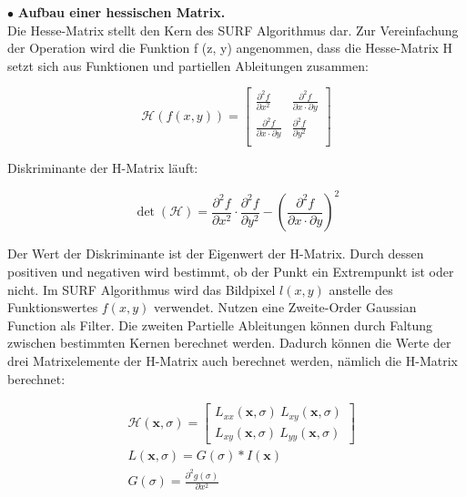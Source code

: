 $\bullet$ \textbf{Aufbau einer hessischen Matrix.}\\
Die Hesse-Matrix stellt den Kern des SURF Algorithmus dar. Zur Vereinfachung der Operation wird die Funktion f (z, y) angenommen, dass die Hesse-Matrix H setzt sich aus Funktionen und partiellen Ableitungen zusammen:

\begin{equation}
   \mathcal{H}(f(x,y)) = \begin{bmatrix}
   \frac{\partial^{2}f}{\partial x^{2}} & \frac{\partial^{2}f}{\partial x \cdot \partial y} \\
   \frac{\partial^{2}f}{\partial x \cdot \partial y} & \frac{\partial^{2}f}{\partial y^{2}} \\   
   \end{bmatrix}
\end{equation}

 Diskriminante der H-Matrix läuft:
 
\begin{equation}
   \det(\mathcal{H}) = \frac{\partial^{2}f}{\partial x^{2}} \cdot \frac{\partial^{2}f}{\partial y^{2}} - (\frac{\partial^{2}f}{\partial x \cdot \partial y})^2  
\end{equation}

Der Wert der Diskriminante ist der Eigenwert der H-Matrix. Durch dessen positiven und negativen wird bestimmt, ob der Punkt ein Extrempunkt ist oder nicht. Im SURF Algorithmus wird das Bildpixel $l(x,y)$ anstelle des Funktionswertes $f(x,y)$ verwendet. Nutzen eine Zweite-Order Gaussian Function als Filter. Die zweiten Partielle Ableitungen können durch Faltung zwischen bestimmten Kernen berechnet werden. Dadurch können die Werte der drei Matrixelemente der H-Matrix auch berechnet werden, nämlich die H-Matrix berechnet:

\begin{equation}
\begin{split}
   &\mathcal{H}(\textbf{x},\sigma) = \begin{bmatrix}
   L_{xx}(\textbf{x},\sigma)\ L_{xy}(\textbf{x},\sigma) \\
   L_{xy}(\textbf{x},\sigma)\ L_{yy}(\textbf{x},\sigma)
   \end{bmatrix} \\   
   &L(\textbf{x},\sigma) = G(\sigma)*I(\textbf{x}) \\  
   &G(\sigma) = \frac{\partial^{2}g(\sigma)}{\partial x^{2}}      
\end{split}
\end{equation}


